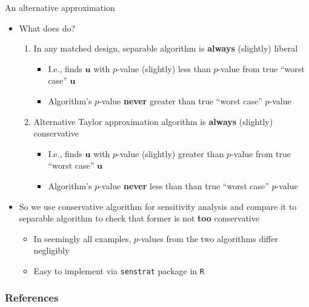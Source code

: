 \documentclass[table, xcolor={dvipsnames}, 9pt]{beamer}
\theoremstyle{newstyle}
\begin{document}
\begin{frame}{An alternative approximation}
\vfill
\begin{itemize} \vfill
\item What does \citet{rosenbaum2018} do? \vfill
\begin{enumerate} \vfill
\item In any matched design, separable algorithm is \textbf{always} (slightly) liberal \vfill
\begin{itemize} \vfill
\item I.e., finds $\bm{u}$ with $p$-value (slightly) less than $p$-value from true ``worst case'' $\bm{u}$ \vfill
\item Algorithm's $p$-value \textbf{never} greater than true ``worst case'' $p$-value \vfill
\end{itemize} \vfill
\item Alternative Taylor approximation algorithm is \textbf{always} (slightly) conservative \vfill
\begin{itemize} \vfill
\item I.e., finds $\bm{u}$ with $p$-value (slightly) greater than $p$-value from true ``worst case'' $\bm{u}$ \vfill
\item Algorithm's $p$-value \textbf{never} less than than true ``worst case'' $p$-value \vfill
\end{itemize} \vfill
\end{enumerate} \vfill
\item So we use conservative algorithm for sensitivity analysis and compare it to separable algorithm to check that former is not \textbf{too} conservative \vfill
\begin{itemize} \vfill
\item In seemingly all examples, $p$-values from the two algorithms differ negligibly \vfill
\item Easy to implement via \texttt{senstrat} package in \texttt{R} \vfill
\end{itemize} \vfill
\end{itemize} \vfill
\end{frame}
\begin{frame}[allowframebreaks]
\frametitle{References} 
\scriptsize

\end{frame}
\end{document}
